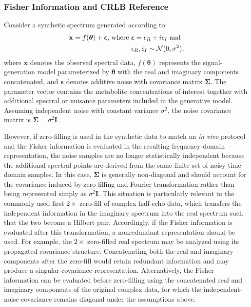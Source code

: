 \subsubsection{Fisher Information and CRLB Reference}
\label{sec:Analy&Visual:subsec:infoStand:subsubsec:fisher reference}
Consider a synthetic spectrum generated according to:
\begin{equation}
\begin{aligned}
    \mathbf{x}=f(\boldsymbol{\theta})+\boldsymbol{\epsilon}\textnormal{, where }&\boldsymbol{\epsilon}=\epsilon_R+i\epsilon_I\textnormal{ and } \\ &\epsilon_R, \epsilon_I \sim \mathcal{N}(0,\sigma^2),
\end{aligned}
\end{equation}
where $\mathbf{x}$ denotes the observed spectral data, $f(\boldsymbol{\theta})$ represents the signal-generation model parameterized by $\boldsymbol{\theta}$ with the real and imaginary components concatenated, and $\boldsymbol{\epsilon}$ denotes additive noise with covariance matrix $\boldsymbol{\Sigma}$. The parameter vector contains the metabolite concentrations of interest together with additional spectral or nuisance parameters included in the generative model. Assuming independent noise with constant variance $\sigma^2$, the noise covariance matrix is $\boldsymbol{\Sigma} = \sigma^2\mathbf{I}$. 

However, if zero-filling is used in the synthetic data to match an \textit{in vivo} protocol and the Fisher information is evaluated in the resulting frequency-domain representation, the noise samples are no longer statistically independent because the additional spectral points are derived from the same finite set of noisy time-domain samples. In this case, $\boldsymbol{\Sigma}$ is generally non-diagonal and should account for the covariance induced by zero-filling and Fourier transformation rather than being represented simply as $\sigma^2\mathbf{I}$. This situation is particularly relevant to the commonly used first $2\times$ zero-fill of complex half-echo \MRS data, which transfers the independent information in the imaginary spectrum into the real spectrum such that the two become a Hilbert pair. Accordingly, if the Fisher information is evaluated after this transformation, a nonredundant representation should be used. For example, the $2\times$ zero-filled real spectrum may be analyzed using its propagated covariance structure. Concatenating both the real and imaginary components after the zero-fill would retain redundant information and may produce a singular covariance representation. Alternatively, the Fisher information can be evaluated before zero-filling using the concatenated real and imaginary components of the original complex data, for which the independent-noise covariance remains diagonal under the assumptions above. 


